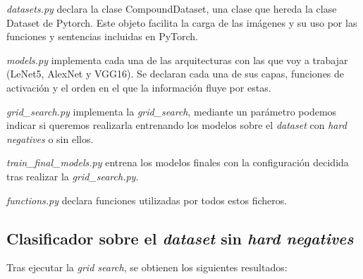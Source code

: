 \noindent \textit{datasets.py} declara la clase CompoundDataset, una clase que hereda la clase Dataset de Pytorch. Este objeto facilita la carga de las imágenes y su uso por las funciones y sentencias incluidas en PyTorch.

\noindent \textit{models.py} implementa cada una de las arquitecturas con las que voy a trabajar (LeNet5, AlexNet y VGG16). Se declaran cada una de sus capas, funciones de activación y el orden en el que la información fluye por estas.

\noindent \textit{grid\_search.py} implementa la \textit{grid\_search}, mediante un parámetro podemos indicar si queremos realizarla entrenando los modelos sobre el \textit{dataset} con \textit{hard negatives} o sin ellos.

\noindent \textit{train\_final\_models.py} entrena los modelos finales con la configuración decidida tras realizar la \textit{grid\_search.py}.

\noindent \textit{functions.py} declara funciones utilizadas por todos estos ficheros.

\newpage
\subsection{Clasificador sobre el \textit{dataset} sin \textit{hard negatives}}
Tras ejecutar la \textit{grid search}, se obtienen los siguientes resultados:

